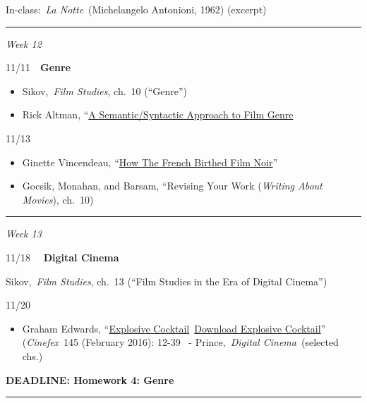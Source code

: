 \documentclass[
  letterpaper,
  DIV=11,
  numbers=noendperiod,
  oneside]{scrartcl}
\providecommand{\tightlist}{%
  \setlength{\itemsep}{0pt}\setlength{\parskip}{0pt}}
\begin{document}
In-class:~\emph{La Notte}~(Michelangelo Antonioni, 1962) (excerpt)

\begin{center}\rule{0.5\linewidth}{0.5pt}\end{center}

\emph{Week 12}

11/11~~\textbf{Genre}

\begin{itemize}
\tightlist
\item
  Sikov,~\emph{Film Studies}, ch.~10 (``Genre'')
\item
  Rick Altman, ``\href{pdf/altman-genre.pdf\%22}{A Semantic/Syntactic
  Approach to Film Genre}
\end{itemize}

11/13~

\begin{itemize}
\item
  Ginette Vincendeau,
  ``\href{https://www2.bfi.org.uk/news-opinion/sight-sound-magazine/features/deep-focus/french-film-noir}{How
  The French Birthed Film Noir}''
\item
  Gocsik, Monahan, and Barsam, ``Revising Your Work (\emph{Writing About
  Movies}), ch.~10)
\end{itemize}

\begin{center}\rule{0.5\linewidth}{0.5pt}\end{center}

\emph{Week 13}

11/18 ~~\textbf{Digital Cinema}

Sikov,~\emph{Film Studies}, ch.~13 (``Film Studies in the Era of Digital
Cinema'')

11/20 ~

\begin{itemize}
\tightlist
\item
  Graham Edwards,
  ``\href{https://franklinpierce.instructure.com/courses/19450/files/2982722?wrap=1}{Explosive
  Cocktail}~\href{https://franklinpierce.instructure.com/courses/19450/files/2982722/download?download*frd=1}{Download
  Explosive Cocktail}'' (\emph{Cinefex}~145 (February 2016): 12-39 ~-
  Prince,~\emph{Digital Cinema}~(selected chs.)
\end{itemize}

\textbf{DEADLINE: Homework 4: Genre}

\begin{center}\rule{0.5\linewidth}{0.5pt}\end{center}
\end{document}

